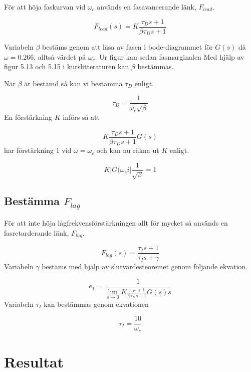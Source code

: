 \documentclass[a4paper]{article}
\begin{document}
För att höja faskurvan vid $\omega_{c}$ används en fasavancerande länk, $F_{lead}$.

\begin{equation}
  F_{lead}(s)=K\frac{\tau_{D}s+1}{\beta\tau_{D}s+1}
\end{equation}

Variabeln $\beta$ bestäms genom att läsa av fasen i bode-diagrammet för $G(s)$ då $\omega = 0.266$, alltså värdet på $\omega_c$.
Ur figur kan sedan fasmarginalen  
Med hjälp av figur 5.13 och 5.15 i kurslitteraturen \cite{kb} kan $\beta$ bestämmas.

När $\beta$ är bestämd så kan vi bestämma $\tau_D$ enligt.

\begin{equation}
  \tau_D=\frac{1}{\omega_c\sqrt{\beta}}
\end{equation}
En förstärkning $K$ införs så att 

\begin{equation}
  K\frac{\tau_Ds+1}{\beta\tau_Ds+1}G(s)
\end{equation}
har förstärkning 1 vid $\omega = \omega_c$ och kan nu räkna ut $K$ enligt.

\begin{equation}
  K|G(\omega_ci|\frac{1}{\sqrt{\beta}}=1
\end{equation}

\subsection{Bestämma $F_{lag}$}

För att inte höja lågfrekvensförstärkningen allt för mycket så används en fasretarderande länk, $F_{lag}$.

\begin{equation}
  F_{lag}(s)=\frac{\tau_Is+1}{\tau_Is+\gamma}
\end{equation}
Variabeln $\gamma$ bestäms med hjälp av slutvärdesteoremet genom följande ekvation.

\begin{equation}
  e_1=\frac{1}{\lim_{s \to 0}K\frac{\tau_Ds+1}{\beta\tau_Ds+1}G(s)s}
\end{equation}
Variabeln $\tau_I$ kan bestämmas genom ekvationen

\begin{equation}
  \tau_I=\frac{10}{\omega_c}
\end{equation}

\section{Resultat}
\end{document}
